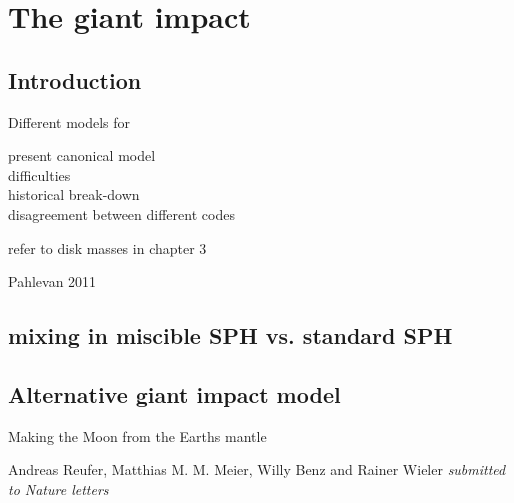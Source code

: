 \chapter{The giant impact}
\label{ch05}
\graphicspath{{./05figs/}}



\section{Introduction}
Different models for 

present canonical model\\
difficulties\\
historical break-down\\
disagreement between different codes\\

\citep{Canup:2010p3713}
\cite{Benz:1985p1755}

refer to disk masses in chapter 3\\

\citep{Benz:1985p1755}
\citep{Benz:1989p1893}
\citep{Cameron:2000p1854}
\citep{Canup:1996p3541}
\citep{Canup:2001p1861}
\citep{Canup:2001p3295}
\citep{Canup:2004p115}
\citep{Canup:2005p1987}
\citep{Canup:2008p3551}
\citep{Ida:1997p3395}
\citep{Pahlevan:2007p2065}
\citep{Kokubo:2000p2195}
\citep{Ida:1997p3395}
\cite{Wiechert:2001p3543}
\cite{Canup:1996p3541}
\cite{Stevenson:1987p3540}
\cite{Wada:2006p1013}



\cite{2011E&PSL.301..433P} Pahlevan 2011


\section{mixing in miscible SPH vs. standard SPH}


\section{Alternative giant impact model}


\clearpage

Making the Moon from the Earths mantle

Andreas Reufer, Matthias M. M. Meier, Willy Benz and Rainer Wieler
\emph{submitted to Nature letters}

